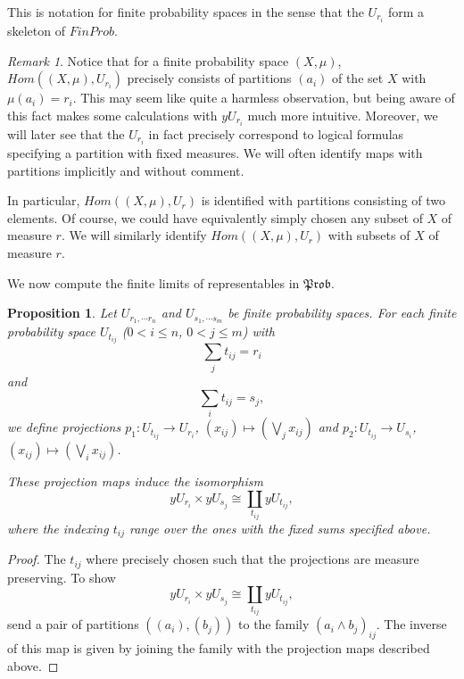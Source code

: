 \documentclass[a4paper]{amsproc}
\theoremstyle{plain}
\newtheorem{proposition}[theorem]{Proposition}
\theoremstyle{definition}
\theoremstyle{remark}
\newtheorem{remark}[theorem]{Remark}
\numberwithin{equation}{section}
\begin{document}
This is notation for finite probability spaces in the sense that the $U_{r_i}$ form a skeleton of $FinProb$.

\begin{remark}
    Notice that for a finite probability space $(X,\mu)$, $Hom((X,\mu), U_{r_i})$ precisely consists of partitions $(a_i)$ of the set $X$ with $\mu(a_i) = r_i$. This may seem like quite a harmless observation, but being aware of this fact makes some calculations with $y U_{r_i}$ much more intuitive. Moreover, we will later see that the $U_{r_i}$ in fact precisely correspond to logical formulas specifying a partition with fixed measures. We will often identify maps with partitions implicitly and without comment.

    In particular, $Hom((X,\mu), U_r)$ is identified with partitions consisting of two elements. Of course, we could have equivalently simply chosen any subset of $X$ of measure $r$. We will similarly identify $Hom((X,\mu), U_r)$ with subsets of $X$ of measure $r$.

\end{remark}

We now compute the finite limits of representables in $\mathfrak{Prob}$.

\begin{proposition} \label{multiproduct}
    Let $U_{r_1, \cdots r_n}$ and $U_{s_1, \cdots s_m}$ be finite probability spaces. For each finite probability space $U_{t_{ij}}$ ($0 < i \leq n$, $0 < j \leq m$) with
    \[
        \sum_j t_{ij} = r_i
    \]
    and
    \[
        \sum_i t_{ij} = s_j ,
    \]
    we define projections $p_1: U_{t_{ij}} \to U_{r_i}$, $(x_{ij}) \mapsto (\bigvee_j x_{ij})$ and $p_2: U_{t_{ij}} \to U_{s_i}$, $(x_{ij}) \mapsto (\bigvee_i x_{ij})$.

    These projection maps induce the isomorphism
    \[
    y U_{r_i} \times y U_{s_j} \cong \coprod_{t_{ij}} y U_{t_{ij}} ,
    \]
    where the indexing $t_{ij}$ range over the ones with the fixed sums specified above.
\end{proposition}
\begin{proof}
    The $t_{ij}$ where precisely chosen such that the projections are measure preserving. To show
    \[
    y U_{r_i} \times y U_{s_j} \cong \coprod_{t_{ij}} y U_{t_{ij}} ,
    \]
    send a pair of partitions $((a_i),(b_j))$ to the family $(a_i \wedge b_j)_{ij}$. The inverse of this map is given by joining the family with the projection maps described above.
\end{proof}
    
\end{document}
